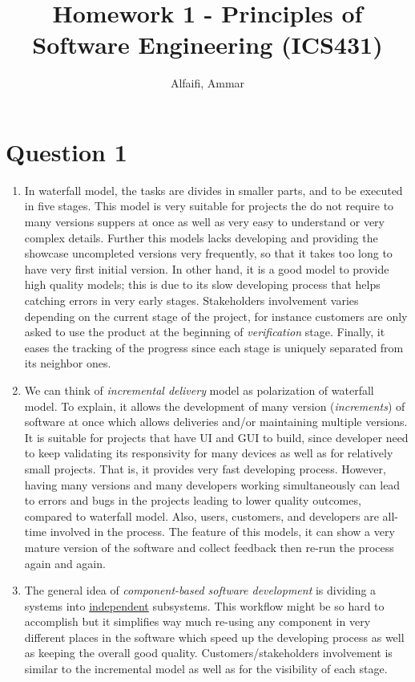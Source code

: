 \documentclass{article}
\title{Homework 1 - Principles of Software Engineering (ICS431)}
\author{Alfaifi, Ammar}
\date{}
\begin{document}
\maketitle

\section*{Question 1}%

\begin{enumerate}[label=\alph*.]
  \item In waterfall model, the tasks are divides in smaller parts, and to be executed in
        five stages. This model is very suitable for projects the do not require to many versions suppers
        at once as well as very easy to understand or very complex details. Further this models lacks
        developing and providing the showcase uncompleted versions very frequently, so that
        it takes too long to have very first initial version. In other hand, it is a good
        model to provide high quality models; this is due to its slow developing process that helps
        catching errors in very early stages. Stakeholders involvement varies depending on the current
        stage of the project, for instance customers are only asked to use the product at the beginning of
        \textit{verification} stage. Finally, it eases the tracking of the progress since each stage is uniquely
        separated from its neighbor ones.

  \item We can think of \textit{incremental delivery} model as polarization of waterfall model. To
        explain, it allows the development of many version (\textit{increments}) of software at once
        which allows deliveries and/or maintaining multiple versions. It is suitable for projects that
        have UI and GUI to build, since developer need to keep validating its responsivity for many devices
        as well as for relatively small projects. That is, it provides very fast developing process.
        However, having many versions and many developers working simultaneously can lead to errors and
        bugs in the projects leading to lower quality outcomes, compared to waterfall model. Also, users,
        customers, and developers are all-time involved in the process. The feature of this models, it can
        show a very mature version of the software and collect feedback then re-run the process again and
        again.

  \item  The general idea of \textit{component-based software development} is dividing a systems into
        \underline{independent} subsystems. This workflow might be so hard to accomplish but it simplifies way
        much re-using any component in very different places in the software which speed up the developing
        process as well as keeping the overall good quality. Customers/stakeholders involvement is similar to
        the incremental model as well as for the visibility of each stage.


\end{enumerate}
\end{document}
